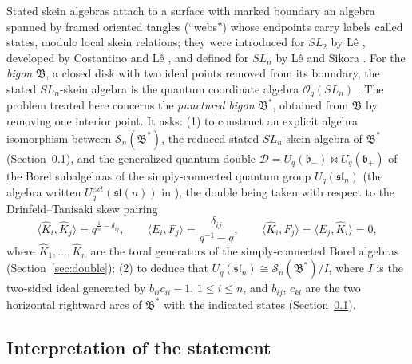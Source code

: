 \documentclass[11pt]{article}
\theoremstyle{remark}
\newcommand{\U}{U_q}
\newcommand{\slN}{\mathfrak{sl}_n}
\newcommand{\bp}{\mathfrak b_+}
\newcommand{\bm}{\mathfrak b_-}
\newcommand{\redS}{\overline{\mathcal S}_n}
\newcommand{\Bstar}{\mathfrak B^*}
\newcommand{\Bigon}{\mathfrak B}
\newcommand{\la}{\langle}
\newcommand{\ra}{\rangle}
\newcommand{\cD}{\mathcal D}
\newcommand{\Oq}{\mathcal O_q(SL_n)}
\begin{document}
Stated skein algebras attach to a surface with marked boundary an
algebra spanned by framed oriented tangles (``webs'') whose endpoints
carry labels called states, modulo local skein relations; they were
introduced for $SL_2$ by L\^e \cite{Le}, developed by Costantino and
L\^e \cite{CL}, and defined for $SL_n$ by L\^e and Sikora \cite{LS}. For the \emph{bigon} $\Bigon$, a closed disk
with two ideal points removed from its boundary, the stated
$SL_n$-skein algebra is the quantum coordinate algebra $\Oq$
\cite[Theorem 6.3]{LS}. The problem treated here concerns the
\emph{punctured bigon} $\Bstar$, obtained from $\Bigon$ by removing one
interior point. It asks:
(1) to construct an explicit algebra isomorphism between
$\redS(\Bstar)$, the reduced stated $SL_n$-skein algebra of $\Bstar$
(Section~\ref{sec:interp}), and the generalized quantum double $\cD=\U(\bm)\bowtie\U(\bp)$ of the
Borel subalgebras of the simply-connected quantum group $\U(\slN)$
(the algebra written $U^{ext}_q(\mathfrak{sl}(n))$ in
\cite[Section 8.5.3]{KS}), the double being taken with respect to the
Drinfeld--Tanisaki skew pairing
\begin{equation}\label{eq:problempairing}
 \la\hat K_i,\hat K_j\ra=q^{\frac1n-\delta_{ij}},\qquad
 \la E_i,F_j\ra=\frac{\delta_{ij}}{q^{-1}-q},\qquad
 \la\hat K_i,F_j\ra=\la E_j,\hat K_i\ra=0 ,
\end{equation}
where $\hat K_1,\dots,\hat K_n$ are the toral generators of the
simply-connected Borel algebras (Section~\ref{sec:double});
(2) to deduce that $\U(\slN)\cong\redS(\Bstar)/I$, where $I$ is
the two-sided ideal generated by $b_{ii}c_{ii}-1$, $1\le i\le n$, and
$b_{ij}$, $c_{kl}$ are the two horizontal rightward arcs of $\Bstar$
with the indicated states (Section~\ref{sec:interp}).

\subsection{Interpretation of the statement}\label{sec:interp}
\end{document}
